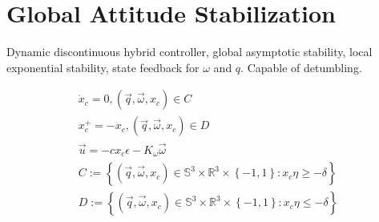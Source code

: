 \section{Global Attitude Stabilization}

Dynamic discontinuous hybrid controller, global asymptotic stability, local exponential stability, state feedback for $\omega$ and $q$. Capable of detumbling.

\[
\begin{array}{l}

\dot{x}_c = 0, (\vec{q},\vec{\omega},x_c) \in C\ \\ 
x_c^+ = -x_c, (\vec{q},\vec{\omega},x_c) \in D\ \\ 
\vec{u} = -c x_c \epsilon -K_\omega \vec{\omega} \\
C:= \left\lbrace (\vec{q},\vec{\omega},x_c) \in \mathbb{S}^3 \times \mathbb{R}^3 \times \left\lbrace -1,1 \right\rbrace : x_c\eta \geq -\delta \right\rbrace  \\

D:= \left\lbrace (\vec{q},\vec{\omega},x_c) \in \mathbb{S}^3 \times \mathbb{R}^3 \times \left\lbrace -1,1 \right\rbrace : x_c\eta \leq -\delta \right\rbrace 
\end{array}
\]